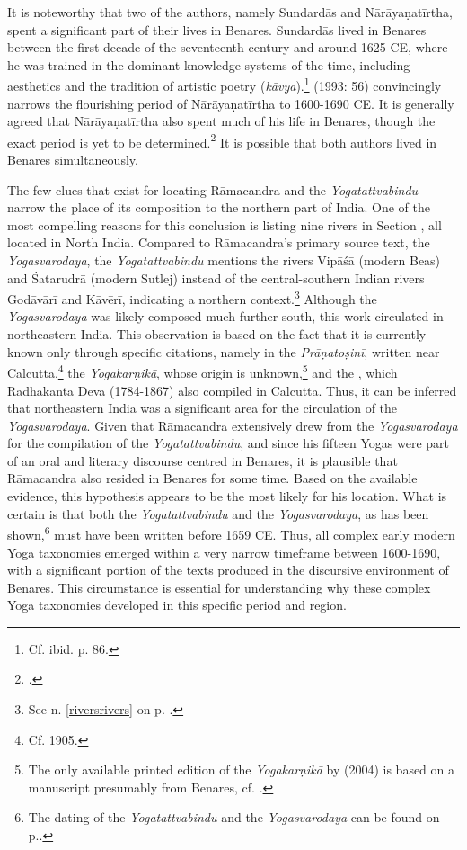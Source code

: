 It is noteworthy that two of the authors, namely Sundardās and Nārāyaṇatīrtha, spent a significant part of their lives in Benares. Sundardās lived in Benares between the first decade of the seventeenth century and around 1625 CE, where he was trained in the dominant knowledge systems of the time, including aesthetics and the tradition of artistic poetry (\textit{kāvya}).\footnote{Cf. ibid. p. 86.} \citeauthor{endo1993} (1993: 56) convincingly narrows the flourishing period of Nārāyaṇatīrtha to 1600-1690 CE. It is generally agreed that Nārāyaṇatīrtha also spent much of his life in Benares, though the exact period is yet to be determined.\footnote{\citeauthor[2004: 24]{penna2004}.} It is possible that both authors lived in Benares simultaneously.

The few clues that exist for locating Rāmacandra and the \textit{Yogatattvabindu} narrow the place of its composition to the northern part of India. One of the most compelling reasons for this conclusion is listing nine rivers in Section , all located in North India. Compared to Rāmacandra's primary source text, the \textit{Yogasvarodaya}, the \emph{Yogatattvabindu} mentions the rivers Vipāśā (modern Beas) and Śatarudrā (modern Sutlej) instead of the central-southern Indian rivers Godāvārī and Kāvērī, indicating a northern context.\footnote{See n. \ref{riversrivers} on p. \pageref{riversrivers}.} Although the \emph{Yogasvarodaya} was likely composed much further south, this work circulated in northeastern India. This observation is based on the fact that it is currently known only through specific citations, namely in the \textit{Prāṇatoṣinī}, written near Calcutta,\footnote{Cf. \citeauthor{shastri1905} 1905.} the \emph{Yogakarṇikā}, whose origin is unknown,\footnote{The only available printed edition of the \emph{Yogakarṇikā} by \citeauthor{yogakarnika} (2004) is based on a manuscript presumably from Benares, cf. \citeauthor[2004: ]{yogakarnika}.} and the , which Radhakanta Deva (1784-1867) also compiled in Calcutta. Thus, it can be inferred that northeastern India was a significant area for the circulation of the \textit{Yogasvarodaya}.
Given that Rāmacandra extensively drew from the \textit{Yogasvarodaya} for the compilation of the \textit{Yogatattvabindu}, and since his fifteen Yogas were part of an oral and literary discourse centred in Benares, it is plausible that Rāmacandra also resided in Benares for some time. Based on the available evidence, this hypothesis appears to be the most likely for his location.
What is certain is that both the \textit{Yogatattvabindu} and the \textit{Yogasvarodaya}, as has been shown,\footnote{The dating of the \textit{Yogatattvabindu} and the \textit{Yogasvarodaya} can be found on p.\pageref{datierung}.} must have been written before 1659 CE. Thus, all complex early modern Yoga taxonomies emerged within a very narrow timeframe between 1600-1690, with a significant portion of the texts produced in the discursive environment of Benares. This circumstance is essential for understanding why these complex Yoga taxonomies developed in this specific period and region.

